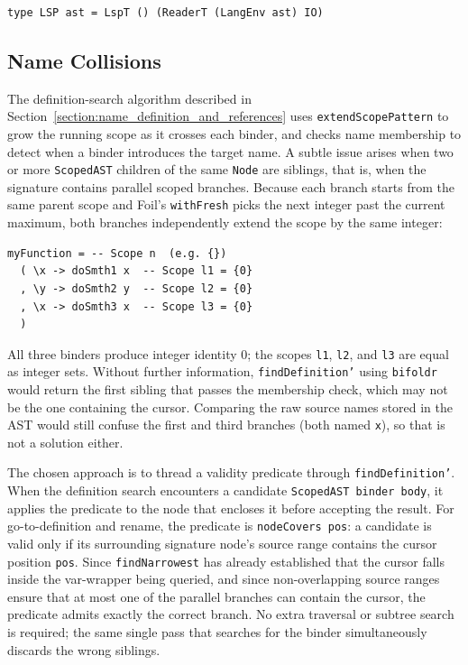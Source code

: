 \begin{verbatim}
type LSP ast = LspT () (ReaderT (LangEnv ast) IO)
\end{verbatim}

\subsection{Name Collisions}

The definition-search algorithm described in Section~\ref{section:name_definition_and_references} uses \texttt{extendScopePattern} to grow the running scope as it crosses each binder, and checks name membership to detect when a binder introduces the target name.
A subtle issue arises when two or more \texttt{ScopedAST} children of the same \texttt{Node} are siblings, that is, when the signature contains parallel scoped branches.
Because each branch starts from the same parent scope and Foil's \texttt{withFresh} picks the next integer past the current maximum, both branches independently extend the scope by the same integer:

\begin{verbatim}
myFunction = -- Scope n  (e.g. {})
  ( \x -> doSmth1 x  -- Scope l1 = {0}
  , \y -> doSmth2 y  -- Scope l2 = {0}
  , \x -> doSmth3 x  -- Scope l3 = {0}
  )
\end{verbatim}

All three binders produce integer identity 0; the scopes \texttt{l1}, \texttt{l2}, and \texttt{l3} are equal as integer sets.
Without further information, \texttt{findDefinition'} using \texttt{bifoldr} would return the first sibling that passes the membership check, which may not be the one containing the cursor.
Comparing the raw source names stored in the AST would still confuse the first and third branches (both named \texttt{x}), so that is not a solution either.

The chosen approach is to thread a validity predicate through \texttt{findDefinition'}.
When the definition search encounters a candidate \texttt{ScopedAST binder body}, it applies the predicate to the node that encloses it before accepting the result.
For go-to-definition and rename, the predicate is \texttt{nodeCovers pos}: a candidate is valid only if its surrounding signature node's source range contains the cursor position \texttt{pos}.
Since \texttt{findNarrowest} has already established that the cursor falls inside the var-wrapper being queried, and since non-overlapping source ranges ensure that at most one of the parallel branches can contain the cursor, the predicate admits exactly the correct branch.
No extra traversal or subtree search is required; the same single pass that searches for the binder simultaneously discards the wrong siblings.

